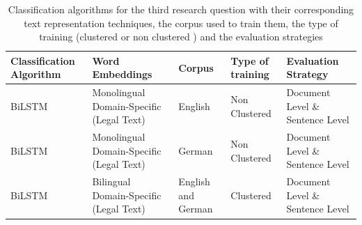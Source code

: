\begin{table}[!ht]
\begin{tabular}{>{\centering\arraybackslash}m{2.9cm}>{\centering\arraybackslash}m{2.9cm}>{\centering\arraybackslash}m{2cm}>{\centering\arraybackslash}m{2cm}>{\centering\arraybackslash}m{2.6cm}}
\hline
\textbf{Classification Algorithm} & \textbf{Word Embeddings} & \textbf{Corpus} & \textbf{Type of training} & \textbf{Evaluation Strategy} \\ \hline
\gls{BiLSTM} & Monolingual Domain-Specific (Legal Text) & English & Non Clustered & Document Level \&  Sentence Level \\ [0.2cm]
\gls{BiLSTM} & Monolingual Domain-Specific (Legal Text) & German & Non Clustered & Document Level \&  Sentence Level \\[0.2cm]

\gls{BiLSTM} & Bilingual Domain-Specific (Legal Text) & English and German & Clustered & Document Level \&  Sentence Level \\ \hline
\end{tabular}
\captionsetup{justification=centering,margin=1cm}
\caption{Classification algorithms for the third research question with their corresponding text representation techniques, the corpus used to train them, the type of training (clustered or non clustered ) and the evaluation strategies}
\label{table:ListQuestionThirdQuestion}
\end{table}